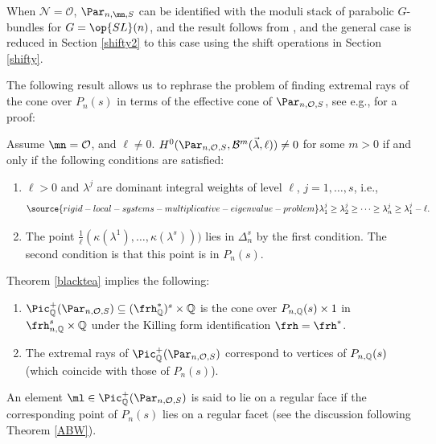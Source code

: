 When $\mathcal{N}=\mathcal{O}$, $\Par_{n,\mn,S}$ can be identified with the moduli stack of parabolic $G$-bundles for $G=\op{SL}(n)$, and the result follows from \cite{LS}, and the general case is reduced in Section \ref{shifty2} to this case using the shift operations in Section \ref{shifty}.


The following result allows us to rephrase the problem of finding extremal rays of the cone over $P_n(s)$ in terms of the effective cone of $\Par_{n,\mathcal{O},S}$, see e.g., \cite[Theorem 5.2]{BKq} for a proof:
\begin{theorem}
\notready\label{blacktea}
Assume $\mn=\mathcal{O}$, and $\ell\neq 0$.
$H^0(\Par_{n,\mathcal{O},S},\mathcal{B}^m(\vec{\lambda},\ell))\neq 0$
for some $m>0$ if and only if the following conditions are satisfied:
\begin{enumerate}
\item $\ell>0$ and $\lambda^j$ are dominant integral weights  of level $\ell$, $j=1,\dots,s$, i.e.,
\begin{equation}\label{weyl}
\source{rigid-local-systems-multiplicative-eigenvalue-problem}
\lambda^{j}_1\geq \lambda^{j}_2\geq \dots\geq \lambda^{j}_n\geq \lambda^{j}_1-\ell.
\end{equation}
\item The point $\frac{1}{\ell}(\kappa(\lambda^1),\dots,\kappa(\lambda^s)))$ lies in $\Delta_n^s$ by the first condition.
The second condition is that this point is in $P_n(s)$.
\end{enumerate}
\end{theorem}

Theorem \ref{blacktea} implies the following:
\begin{proposition}
\notready\label{b9}

\begin{enumerate}
\item $\Pic^+_{\Bbb{Q}}(\Par_{n,\mathcal{O},S})\subseteq (\frh_{\Bbb{Q}}^*)^s\times\Bbb{Q}$ is the cone over $P_{n,\Bbb{Q}}(s)\times 1$ in $\frh^s_{n,\Bbb{Q}}\times \Bbb{Q}$ under the Killing form identification $\frh=\frh^*$.
\item
The extremal rays of $\Pic^+_{\Bbb{Q}}(\Par_{n,\mathcal{O},S})$ correspond to vertices of $P_{n,\Bbb{Q}}(s)$ (which coincide with those of $P_{n}(s)$).
\end{enumerate}
\end{proposition}
\begin{defi}
\notready
An element $\ml\in \Pic^+_{\Bbb{Q}}(\Par_{n,\mathcal{O},S})$ is said to lie on a regular face if the corresponding point of  $P_{n}(s)$ lies on a regular facet (see the discussion following Theorem \ref{ABW}).
\end{defi}



